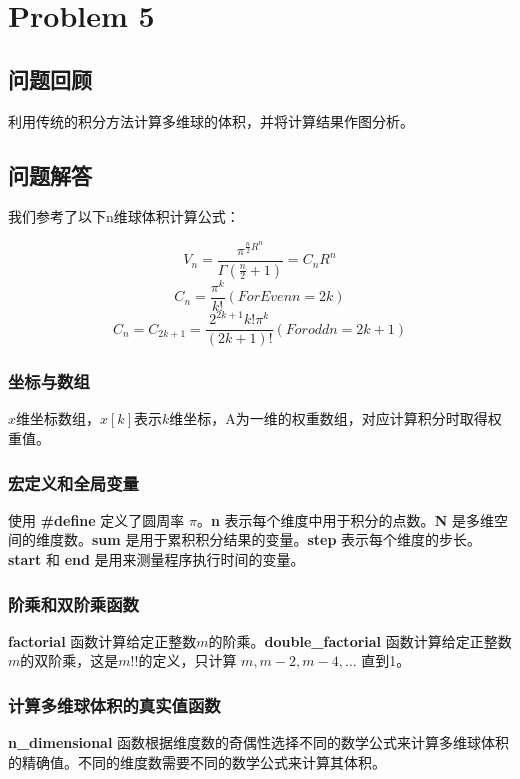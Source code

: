 \documentclass[UTF8]{ctexart}
\begin{document}
    \newpage

    \section{Problem 5}
    \subsection{问题回顾}
    利用传统的积分方法计算多维球的体积，并将计算结果作图分析。
    \subsection{问题解答}
    我们参考了以下n维球体积计算公式：

    \[V_n=\frac{\pi^{\frac{n}{2}R^n}}{\Gamma(\frac{n}{2}+1)}=C_nR^n\]
    \[C_n=\frac{\pi^k}{k!} (For Even n=2k)\]
    \[C_n=C_{2k+1}=\frac{2^{2k+1}k!\pi^k}{(2k+1)!} (For odd n=2k+1)\]

    \subsubsection{坐标与数组}
    $x$维坐标数组，$x\left[k\right]$表示$k$维坐标，A为一维的权重数组，对应计算积分时取得权重值。
    \subsubsection{宏定义和全局变量}

    使用 \textbf{\#define} 定义了圆周率 $\pi$。\textbf{n} 表示每个维度中用于积分的点数。\textbf{N} 是多维空间的维度数。\textbf{sum} 是用于累积积分结果的变量。\textbf{step} 表示每个维度的步长。\textbf{start} 和 \textbf{end} 是用来测量程序执行时间的变量。

    \subsubsection{阶乘和双阶乘函数}

    \textbf{factorial} 函数计算给定正整数$ m $的阶乘。\textbf{double\_factorial} 函数计算给定正整数 $m $的双阶乘，这是$ m!! $的定义，只计算 $m, m-2, m-4, \dots$ 直到1。

    \subsubsection{计算多维球体积的真实值函数}
    \textbf{n\_dimensional} 函数根据维度数的奇偶性选择不同的数学公式来计算多维球体积的精确值。不同的维度数需要不同的数学公式来计算其体积。
\end{document}
